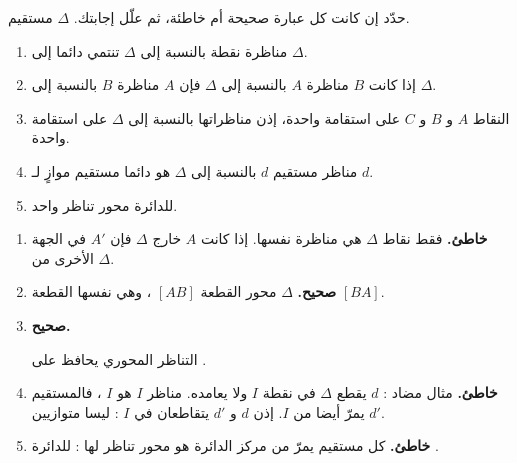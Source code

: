 \documentclass[12pt,a4paper]{article}
\begin{document}
\begin{corr}[title={صحيح أم خاطئ ؟}, stars=1, source={Axiomaths}]
حدّد إن كانت كل عبارة صحيحة أم خاطئة، ثم علّل إجابتك. $\Delta$ مستقيم.
\begin{enumerate}
  \item مناظرة نقطة بالنسبة إلى $\Delta$ تنتمي دائما إلى $\Delta$.
  \item إذا كانت $B$ مناظرة $A$ بالنسبة إلى $\Delta$ فإن $A$ مناظرة $B$ بالنسبة إلى $\Delta$.
  \item النقاط $A$ و $B$ و $C$ على استقامة واحدة، إذن مناظراتها بالنسبة إلى $\Delta$ على استقامة واحدة.
  \item مناظر مستقيم $d$ بالنسبة إلى $\Delta$ هو دائما مستقيم موازٍ لـ $d$.
  \item للدائرة محور تناظر واحد.
\end{enumerate}
\axsol
\begin{enumerate}[itemsep=12pt]
  \item \textbf{خاطئ.} فقط نقاط $\Delta$ هي مناظرة نفسها. إذا كانت $A$ خارج $\Delta$ فإن $A'$ في الجهة الأخرى من $\Delta$.
  \item \textbf{صحيح.} $\Delta$ محور القطعة $[AB]$ ، وهي نفسها القطعة $[BA]$.
  \item \textbf{صحيح.}
  \begin{prop}
  التناظر المحوري يحافظ على .
  \end{prop}
  \item \textbf{خاطئ.} مثال مضاد : $d$ يقطع $\Delta$ في نقطة $I$ ولا يعامده. مناظر $I$ هو $I$ ، فالمستقيم $d'$ يمرّ أيضا من $I$. إذن $d$ و $d'$ يتقاطعان في $I$ : ليسا متوازيين.
  \begin{center}
  \end{center}
  \item \textbf{خاطئ.} كل مستقيم يمرّ من مركز الدائرة هو محور تناظر لها : للدائرة .
\end{enumerate}
\end{corr}
\end{document}
